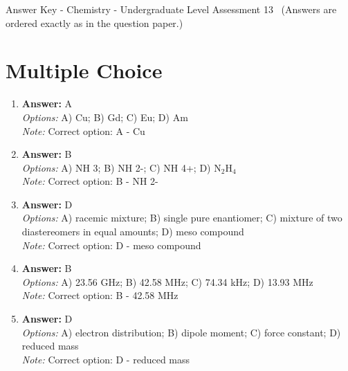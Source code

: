 \documentclass[12pt]{article}
\begin{document}
\begin{center}
Answer Key - Chemistry - Undergraduate Level Assessment 13 \
\small (Answers are ordered exactly as in the question paper.)
\end{center}

\section*{Multiple Choice}
\begin{enumerate}[label=\arabic*.]
\item \textbf{Answer:} A
\\ \textit{Options:} A) Cu; B) Gd; C) Eu; D) Am
\\ \textit{Note:} Correct option: A - Cu
\item \textbf{Answer:} B
\\ \textit{Options:} A) NH 3; B) NH 2-; C) NH 4+; D) N$_{2}$H$_{4}$
\\ \textit{Note:} Correct option: B - NH 2-
\item \textbf{Answer:} D
\\ \textit{Options:} A) racemic mixture; B) single pure enantiomer; C) mixture of two diastereomers in equal amounts; D) meso compound
\\ \textit{Note:} Correct option: D - meso compound
\item \textbf{Answer:} B
\\ \textit{Options:} A) 23.56 GHz; B) 42.58 MHz; C) 74.34 kHz; D) 13.93 MHz
\\ \textit{Note:} Correct option: B - 42.58 MHz
\item \textbf{Answer:} D
\\ \textit{Options:} A) electron distribution; B) dipole moment; C) force constant; D) reduced mass
\\ \textit{Note:} Correct option: D - reduced mass
\end{enumerate}
\end{document}

